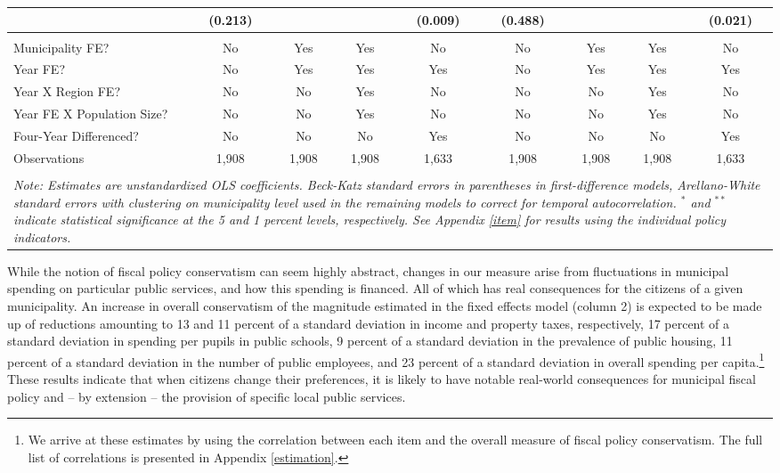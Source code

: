 \documentclass[a4paper,12pt]{article}
\begin{document}
\begin{landscape}
\begin{table}[!htbp]
\begin{tabular}{@{\extracolsep{5pt}}lcccccccc}
			& (0.213) &  &  & (0.009) & (0.488) &  &  & (0.021) \\ 
			\hline \\[-1.8ex]
			Municipality FE? & No & Yes & Yes & No & No & Yes & Yes & No \\ 
			Year FE? & No & Yes & Yes & Yes & No & Yes & Yes & Yes \\ 
			Year X Region FE? & No & No & Yes & No & No & No & Yes & No \\ 
			Year FE X Population Size? & No & No & Yes & No & No & No & Yes & No \\ 
			Four-Year Differenced? & No & No & No & Yes & No & No & No & Yes \\ 
			Observations & 1,908 & 1,908 & 1,908 & 1,633 & 1,908 & 1,908 & 1,908 & 1,633 \\ 
			\hline 
			\hline \\[-1.8ex] 
			\multicolumn{9}{p{25 cm}}{\emph{Note: Estimates are unstandardized OLS coefficients. Beck-Katz standard errors in parentheses in first-difference models, Arellano-White standard errors with clustering on municipality level used in the remaining models to correct for temporal autocorrelation. $^{*}$ and $^{**}$ indicate statistical significance at the 5 and 1 percent levels, respectively. See Appendix \ref{item} for results using the individual policy indicators.}} \\
		\end{tabular} 
	\end{table}
	
\end{landscape}

While the notion of fiscal policy conservatism can seem highly abstract, changes in our measure arise from fluctuations in municipal spending on particular public services, and how this spending is financed. All of which has real consequences for the citizens of a given municipality. An increase in overall conservatism of the magnitude estimated in the fixed effects model (column 2) is expected to be made up of reductions amounting to 13 and 11 percent of a standard deviation in income and property taxes, respectively, 17 percent of a standard deviation in spending per pupils in public schools, 9 percent of a standard deviation in the prevalence of public housing, 11 percent of a standard deviation in the number of public employees, and 23 percent of a standard deviation in overall spending per capita.\footnote{We arrive at these estimates by using the correlation between each item and the overall measure of fiscal policy conservatism. The full list of correlations is presented in Appendix \ref{estimation}.} These results indicate that when citizens change their preferences, it is likely to have notable real-world consequences for municipal fiscal policy and -- by extension -- the provision of specific local public services. 
\end{document}
